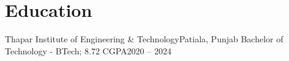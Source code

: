 \section{Education}
\resumeSubHeadingListStart
  \resumeSubheading
    {Thapar Institute of Engineering \& Technology}{Patiala, Punjab}
    {Bachelor of Technology - BTech; 8.72 CGPA}{2020 -- 2024}
\resumeSubHeadingListEnd